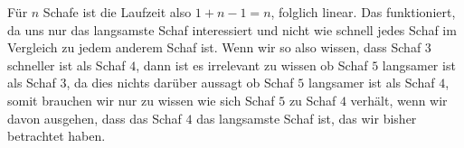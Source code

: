 \documentclass[11pt]{scrartcl}
\begin{document}
Für $ n $ Schafe ist die Laufzeit also $ 1 + n - 1 = n $, folglich linear.
Das funktioniert, da uns nur das langsamste Schaf interessiert und nicht wie schnell jedes Schaf im Vergleich zu jedem anderem Schaf ist.
Wenn wir so also wissen, dass Schaf $ 3 $ schneller ist als Schaf $ 4 $, dann ist es irrelevant zu wissen ob Schaf $ 5 $ langsamer ist als Schaf $ 3 $, da dies nichts darüber aussagt ob Schaf $ 5 $ langsamer ist als Schaf $ 4 $, somit brauchen wir nur zu wissen wie sich Schaf $ 5 $ zu Schaf $ 4 $ verhält, wenn wir davon ausgehen, dass das Schaf $ 4 $ das langsamste Schaf ist, das wir bisher betrachtet haben.



\end{document}
